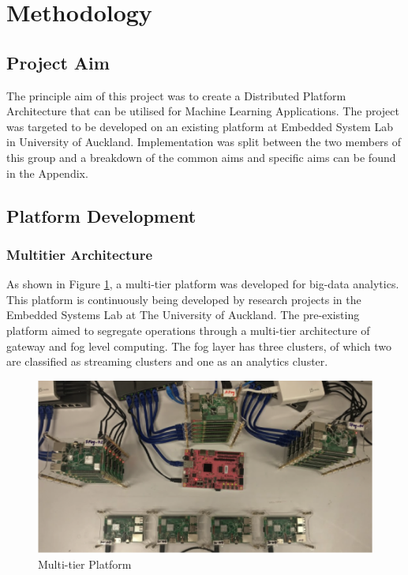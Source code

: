 
\section{Methodology}
\subsection{Project Aim}
The principle aim of this project was to create a Distributed Platform Architecture that can be utilised for Machine Learning Applications. The project was targeted to be developed on an existing platform at Embedded System Lab in University of Auckland. Implementation was split between the two members of this group and a breakdown of the common aims and specific aims can be found in the Appendix.


\subsection{Platform Development}

\subsubsection{Multitier Architecture}     
    \begin{flushleft}
        As shown in Figure \ref{fig:Multi-tier Platform}, a multi-tier platform was developed for big-data analytics. This platform is continuously being developed by research projects in the Embedded Systems Lab at The University of Auckland. The pre-existing platform aimed to segregate operations through a multi-tier architecture of gateway and fog level computing. The fog layer has three clusters, of which two are classified as streaming clusters and one as an analytics cluster.  
        
        \begin{figure}[H]
      
          \includegraphics[width=\textwidth]{images/MultitierPlatform.png}
          \caption{Multi-tier Platform}
          \label{fig:Multi-tier Platform}
        \end{figure}
        
    \end{flushleft}

